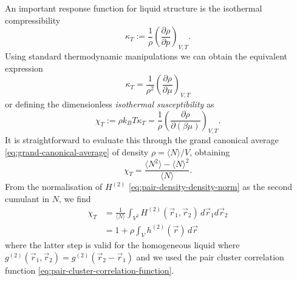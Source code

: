An important response function for liquid structure is the isothermal compressibility
\begin{equation*}\label{eq:isothermal-compressibility}
  \kappa_T
  :=
  \frac{1}{\rho}
  \left( \frac{\partial \rho}{\partial p} \right)_{V,T}.
\end{equation*}
Using standard thermodynamic manipulations we can obtain the equivalent expression
\begin{equation*}
  \kappa_T
  =
  \frac{1}{\rho^2}
  \left( \frac{\partial \rho}{\partial \mu} \right)_{V,T}
\end{equation*}
or defining the dimensionless \emph{isothermal susceptibility} as \begin{equation*}\label{eq:isothermal-susceptibility}
  \chi_T
  :=
  \rho k_B T \kappa_T
  =
  \frac{1}{\rho}
  \left( \frac{\partial \rho}{\partial (\beta \mu)} \right)_{V,T}.
\end{equation*}
It is straightforward to evaluate this through the grand canonical average \eqref{eq:grand-canonical-average} of density $\rho = \langle N \rangle / V$, obtaining%
\begin{equation}\label{eq:chiT-inhomogeneous}
  \chi_T
  =
  \frac{ \langle N^2 \rangle - \langle N \rangle^2 }{\langle N \rangle}.
\end{equation}
From the normalisation of $H^{(2)}$ \eqref{eq:pair-density-density-norm} as the second cumulant in $N$, we find
\begin{equation}\label{eq:compressibility-h2}
  \begin{split}
    \chi_T
    &=
    \frac{1}{\langle N \rangle}
    \int_{V^2} H^{(2)}(\vec{r}_1, \vec{r}_2) \, d\vec{r}_1 d\vec{r}_2
    \\ &=
    1
    + \rho \int_V h^{(2)}(\vec{r}) \, d\vec{r}
  \end{split}
\end{equation}
where the latter step is valid for the homogeneous liquid where $g^{(2)}(\vec{r}_1, \vec{r}_2) = g^{(2)}(\vec{r}_2 - \vec{r}_1)$ and we used the pair cluster correlation function \eqref{eq:pair-cluster-correlation-function}.

